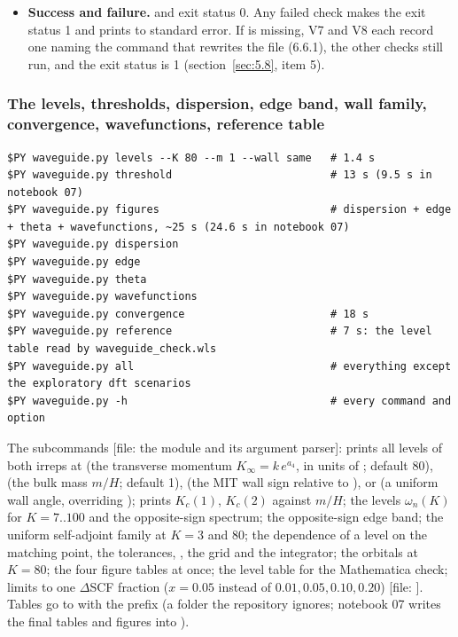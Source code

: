 \begin{itemize}
  \item \textbf{Success and failure.}  and exit status 0. Any failed check makes the exit status 1 and prints  to standard error. If  is missing, V7 and V8 each record one  naming the command that rewrites the file (6.6.1), the other checks still run, and the exit status is 1 (section~\ref{sec:5.8}, item 5).
\end{itemize}

\subsubsection{The levels, thresholds, dispersion, edge band, wall family, convergence, wavefunctions, reference table}
\label{sec:6.6.3}

\begin{Verbatim}
$PY waveguide.py levels --K 80 --m 1 --wall same   # 1.4 s
$PY waveguide.py threshold                         # 13 s (9.5 s in notebook 07)
$PY waveguide.py figures                           # dispersion + edge + theta + wavefunctions, ~25 s (24.6 s in notebook 07)
$PY waveguide.py dispersion
$PY waveguide.py edge
$PY waveguide.py theta
$PY waveguide.py wavefunctions
$PY waveguide.py convergence                       # 18 s
$PY waveguide.py reference                         # 7 s: the level table read by waveguide_check.wls
$PY waveguide.py all                               # everything except the exploratory dft scenarios
$PY waveguide.py -h                                # every command and option
\end{Verbatim}

The subcommands [file: the module and its argument parser]:  prints all levels of both irreps at  (the transverse momentum $K_\infty=k\,e^{a_4}$, in units of ; default 80),  (the bulk mass $m/H$; default 1),  (the MIT wall sign relative to ), or  (a uniform wall angle, overriding );  prints $K_{c}(1)$, $K_{c}(2)$ against $m/H$;  the levels $\omega_{n}(K)$ for $K=7..100$ and the opposite-sign spectrum;  the opposite-sign edge band;  the uniform self-adjoint family at $K = 3$ and 80;  the dependence of a level on the matching point, the tolerances, , the  grid and the integrator;  the orbitals at $K = 80$;  the four figure tables at once;  the level table for the Mathematica check;  limits  to one $\Delta$SCF fraction ($x = 0.05$ instead of $0.01, 0.05, 0.10, 0.20$) [file: ]. Tables go to  with the prefix  (a folder the repository ignores; notebook 07 writes the final tables and figures into ).

